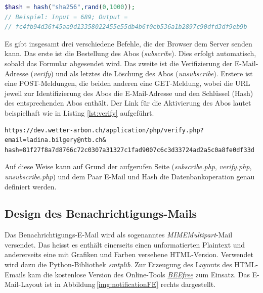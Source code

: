 \vspace{3mm}
\begin{lstlisting}[label=lst:randomHash,caption=Funktion zur Erzeugung des eindeutigen Hash, language=php, style=php]
$hash = hash("sha256",rand(0,1000));
// Beispiel: Input = 689; Output =
// fc4fb94d36f45aa9d13358022455e55db4b6f0eb536a1b2897c90dfd3df9eb9b

\end{lstlisting}
\vspace{3mm}

\noindent
Es gibt insgesamt drei verschiedene Befehle, die der Browser dem Server senden kann. Das erste ist die Bestellung des Abos (\textit{subscribe}). Dies erfolgt automatisch, sobald das Formular abgesendet wird. Das zweite ist die Verifizierung der E-Mail-Adresse (\textit{verify}) und als letztes die Löschung des Abos (\textit{unsubscribe}). Erstere ist eine POST-Meldungen, die beiden anderen eine GET-Meldung, wobei die URL jeweil zur Identifizierung des Abos die E-Mail-Adresse und den Schlüssel (Hash) des entsprechenden Abos enthält. Der Link für die Aktivierung des Abos lautet beispielhaft wie in Listing \ref{lst:verify} aufgeführt.

\vspace{3mm}
\begin{lstlisting}[label=lst:verify,caption=Beispiellink für die Aktivierung eines Abos, language=HTML5, style=htmlcssjs]
https://dev.wetter-arbon.ch/application/php/verify.php?
email=ladina.bilgery@ntb.ch&
hash=81f27f8a7d8766c72c0307a31327c1fad9007c6c3d33724ad2a5c0a8fe0df33d
\end{lstlisting}
\vspace{3mm}

\noindent
Auf diese Weise kann auf Grund der aufgerufen Seite (\textit{subscribe.php}, \textit{verify.php}, \textit{unsubscribe.php}) und dem Paar E-Mail und Hash die Datenbankoperation genau definiert werden.

\subsection{Design des Benachrichtigungs-Mails}
Das Benachrichtigungs-E-Mail wird als sogenanntes \emph{MIMEMultipart}-Mail versendet. Das heisst es enthält einerseits einen unformatierten Plaintext und andererseits eine mit Grafiken und Farben versehene HTML-Version. Verwendet wird dazu die Python-Bibliothek \emph{smtplib}. Zur Erzeugung des Layouts des HTML-Emails kam die kostenlose Version des Online-Tools \emph{\href{https://beefree.io/bee-free/}{BEEfree}} zum Einsatz. Das E-Mail-Layout ist in Abbildung\,\ref{img:notificationFE} rechts dargestellt.



